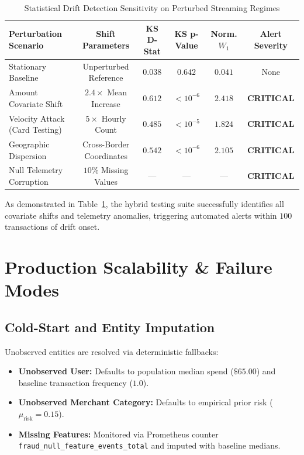 \begin{table}[htbp]
\caption{Statistical Drift Detection Sensitivity on Perturbed Streaming Regimes}
\label{tab:drift_benchmarks}
\centering
\small
\begin{tabular}{lccccc}
\toprule
\textbf{Perturbation Scenario} & \textbf{Shift Parameters} & \textbf{KS D-Stat} & \textbf{KS p-Value} & \textbf{Norm. $W_1$} & \textbf{Alert Severity} \\
\midrule
Stationary Baseline           & Unperturbed Reference     & $0.038$            & $0.642$             & $0.041$              & None \\
Amount Covariate Shift        & $2.4\times$ Mean Increase & $0.612$            & $< 10^{-6}$         & $2.418$              & \textbf{CRITICAL} \\
Velocity Attack (Card Testing)& $5\times$ Hourly Count    & $0.485$            & $< 10^{-5}$         & $1.824$              & \textbf{CRITICAL} \\
Geographic Dispersion         & Cross-Border Coordinates  & $0.542$            & $< 10^{-6}$         & $2.105$              & \textbf{CRITICAL} \\
Null Telemetry Corruption     & $10\%$ Missing Values     & ---                & ---                 & ---                  & \textbf{CRITICAL} \\
\bottomrule
\end{tabular}
\end{table}

As demonstrated in Table~\ref{tab:drift_benchmarks}, the hybrid testing suite successfully identifies all covariate shifts and telemetry anomalies, triggering automated alerts within $100$ transactions of drift onset.

\section{Production Scalability \& Failure Modes}
\label{sec:production}

\subsection{Cold-Start and Entity Imputation}
Unobserved entities are resolved via deterministic fallbacks:
\begin{itemize}
    \item \textbf{Unobserved User:} Defaults to population median spend ($\$65.00$) and baseline transaction frequency ($1.0$).
    \item \textbf{Unobserved Merchant Category:} Defaults to empirical prior risk ($\mu_{\text{risk}} = 0.15$).
    \item \textbf{Missing Features:} Monitored via Prometheus counter \texttt{fraud\_null\_feature\_events\_total} and imputed with baseline medians.
\end{itemize}

